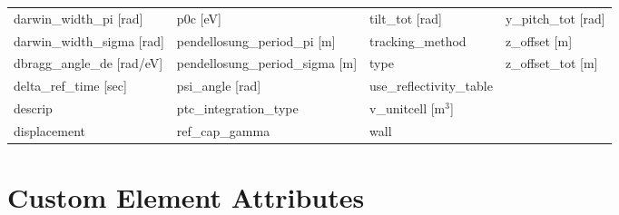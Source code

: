 \begin{tabular}{llll}
darwin_width_pi [rad]            & p0c [eV]                         & tilt_tot [rad]                   & y_pitch_tot [rad]                \\
darwin_width_sigma [rad]         & pendellosung_period_pi [m]       & tracking_method                  & z_offset [m]                     \\
dbragg_angle_de [rad/eV]         & pendellosung_period_sigma [m]    & type                             & z_offset_tot [m]                 \\
delta_ref_time [sec]             & psi_angle [rad]                  & use_reflectivity_table           &                                  \\
descrip                          & ptc_integration_type             & v_unitcell [m$^3$]               &                                  \\
displacement                     & ref_cap_gamma                    & wall                             &                                  \\
 \bottomrule
 \end{tabular}
 \vfill
 
 \section{Custom Element Attributes}
 \label{s:list.custom}
 
